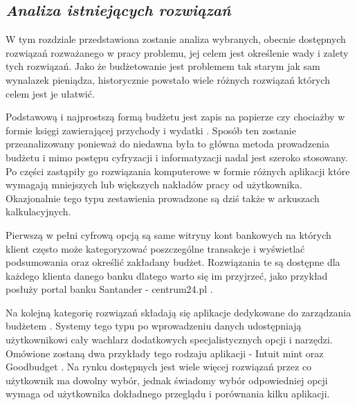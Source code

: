 \documentclass[a4paper,10pt, twoside]{report}
\newcommand{\customstylechapter}[1]{\large{\textit{#1}}}
\begin{document}
\begin{large}
\chapter{\customstylechapter{Analiza istniejących rozwiązań}}
{W tym rozdziale przedstawiona zostanie analiza wybranych, obecnie dostępnych
rozwiązań rozważanego w pracy problemu, jej celem jest określenie wady i zalety 
tych rozwiązań. Jako że budżetowanie jest problemem tak starym jak sam wynalazek
 pieniądza, historycznie powstało wiele różnych rozwiązań których celem jest je 
ułatwić.}

{Podstawową i najprostszą formą budżetu jest zapis na papierze czy chociażby w 
formie księgi zawierającej przychody i wydatki \cite{o24_budzetowanie}. Sposób ten zostanie 
przeanalizowany ponieważ do niedawna była to główna metoda prowadzenia budżetu 
i mimo postępu cyfryzacji i informatyzacji nadal jest szeroko stosowany. Po 
części zastąpiły go rozwiązania komputerowe w formie różnych aplikacji które 
wymagają mniejszych lub większych nakładów pracy od użytkownika. Okazjonalnie 
tego typu zestawienia prowadzone są dziś także w arkuszach kalkulacyjnych.}

{Pierwszą w pełni cyfrową opcją są same witryny kont bankowych \cite{ingbudżet} 
na których klient często może kategoryzować poszczególne transakcje i wyświetlać
 podsumowania oraz określić zakładany budżet. Rozwiązania te są dostępne dla 
każdego klienta danego banku dlatego warto się im przyjrzeć, jako przykład 
posłuży portal banku Santander - centrum24.pl \cite{santandercentrum24}.}

{Na kolejną kategorię rozwiązań składają się aplikacje dedykowane do zarządzania
 budżetem \cite{budget}. Systemy tego typu po wprowadzeniu danych udostępniają 
użytkownikowi cały wachlarz dodatkowych specjalistycznych opcji i narzędzi. 
Omówione zostaną dwa przykłady tego rodzaju aplikacji - Intuit mint \cite{mint} 
oraz Goodbudget \cite{goodbudget}. Na rynku dostępnych jest wiele więcej 
rozwiązań przez co użytkownik ma dowolny wybór, jednak świadomy wybór 
odpowiedniej opcji wymaga od użytkownika dokładnego przeglądu i porównania kilku
 aplikacji.}


\end{large}
\end{document}

